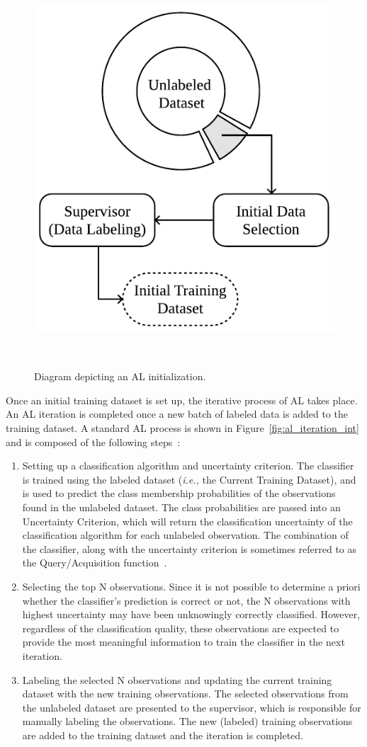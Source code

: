 \begin{figure}[ht]
	\centering
	\includegraphics[width=.35\linewidth]{al_initialization}
    \caption{%
        Diagram depicting an AL initialization.
    }~\label{fig:al_initialization}
\end{figure}

Once an initial training dataset is set up, the iterative process of AL takes
place. An AL iteration is completed once a new batch of labeled data is added
to the training dataset. A standard AL process is shown in
Figure~\ref{fig:al_iteration_int} and is composed of the following
steps~\cite{Su2020, Sverchkov2017}:

\begin{enumerate}

    \item Setting up a classification algorithm and uncertainty criterion. The
        classifier is trained using the labeled dataset (\textit{i.e.,} the
        Current Training Dataset), and is used to predict the class membership
        probabilities of the observations found in the unlabeled dataset. The
        class probabilities are passed into an Uncertainty Criterion, which
        will return the classification uncertainty of the classification
        algorithm for each unlabeled observation. The combination of the
        classifier, along with the uncertainty criterion is sometimes referred
        to as the Query/Acquisition function~\cite{Rosario2020}.

    \item Selecting the top N observations. Since it is not possible to
        determine a priori whether the classifier's prediction is correct or
        not, the N observations with highest uncertainty may have been
        unknowingly correctly classified. However, regardless of the
        classification quality, these observations are expected to provide the
        most meaningful information to train the classifier in the next
        iteration.

    \item Labeling the selected N observations and updating the current
        training dataset with the new training observations. The selected
        observations from the unlabeled dataset are presented to the
        supervisor, which is responsible for manually labeling the
        observations. The new (labeled) training observations are added to the
        training dataset and the iteration is completed.

\end{enumerate}

